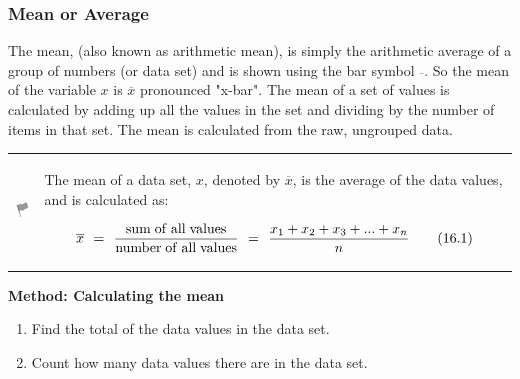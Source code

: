 \begin{description}[noitemsep]
\begin{description}[noitemsep]
            \subsubsection{ Mean or Average}
            \nopagebreak
          \label{m39400*id211176}The mean, (also known as arithmetic mean), is simply the arithmetic average of a group of numbers (or data set) and is shown using the bar symbol \hspace{1ex} $\overline{}$. So the mean of the variable $x$ is $\overline{x}$ pronounced "x-bar". The mean of a set of values is calculated by adding up all the values in the set and dividing by the number of items in that set. The mean is calculated from the raw, ungrouped data.\par 
\label{m39400*fhsst!!!underscore!!!id1287}\begin{definition}
	  \begin{tabular*}{15 cm}{m{15 mm}m{}}
	\hspace*{-50pt}  \includegraphics[width=0.5in]{col11306.imgs/psflag2.png}   & \Definition{   \label{id2621067}\textbf{ Mean }} { \label{m39400*meaningfhsst!!!underscore!!!id1287}
          \label{m39400*id211228}The mean of a data set, $x$, denoted by $\overline{x}$, is the average of the data values, and is calculated as:\par 
          \label{m39400*uid61}\nopagebreak\noindent{}
    \begin{equation}
    \overline{x}\phantom{\rule{4pt}{0ex}}=\phantom{\rule{4pt}{0ex}}\frac{\mathrm{sum\; of\; all\; values}}{\mathrm{number\; of\; all\; values}}\phantom{\rule{4pt}{0ex}}=\phantom{\rule{4pt}{0ex}}\frac{{x}_{1}+{x}_{2}+{x}_{3}+...+{x}_{n}}{n}\tag{16.1}
      \end{equation}
           } 
      \end{tabular*}
      \end{definition}
          \label{m39400*id211421}
            \textbf{Method: Calculating the mean}
          \par 
          \label{m39400*id211428}\begin{enumerate}[noitemsep, label=\textbf{\arabic*}. ] 
            \label{m39400*uid62}\item Find the total of the data values in the data set.
\label{m39400*uid63}\item Count how many data values there are in the data set.

\end{enumerate}
\end{description}
\end{description}

